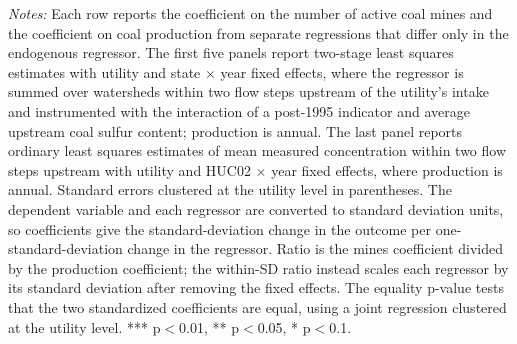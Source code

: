 \begin{table}[htbp]
\begin{minipage}{\linewidth}
\vspace{4pt}
\footnotesize
\raggedright
\textit{Notes:} Each row reports the coefficient on the number of active coal mines and the coefficient on coal production from separate regressions that differ only in the endogenous regressor. The first five panels report two-stage least squares estimates with utility and state $\times$ year fixed effects, where the regressor is summed over watersheds within two flow steps upstream of the utility's intake and instrumented with the interaction of a post-1995 indicator and average upstream coal sulfur content; production is annual. The last panel reports ordinary least squares estimates of mean measured concentration within two flow steps upstream with utility and HUC02 $\times$ year fixed effects, where production is annual. Standard errors clustered at the utility level in parentheses. The dependent variable and each regressor are converted to standard deviation units, so coefficients give the standard-deviation change in the outcome per one-standard-deviation change in the regressor. Ratio is the mines coefficient divided by the production coefficient; the within-SD ratio instead scales each regressor by its standard deviation after removing the fixed effects. The equality p-value tests that the two standardized coefficients are equal, using a joint regression clustered at the utility level. *** p$<$0.01, ** p$<$0.05, * p$<$0.1.
\end{minipage}
\end{table}
